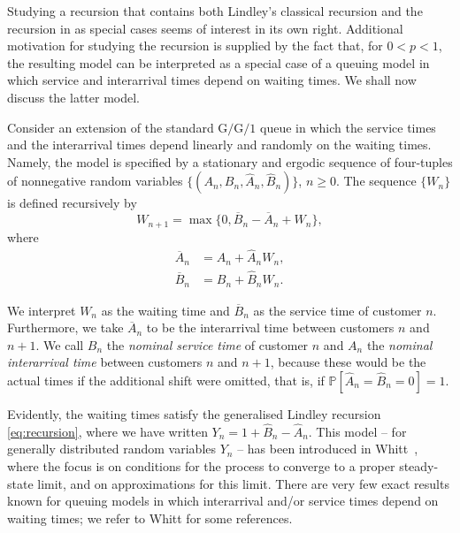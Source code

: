 \documentclass[reqno, 11pt, a4paper]{article}
\theoremstyle{plain}
\theoremstyle{remark}
\numberwithin{equation}{section}
\begin{document}
Studying a recursion that contains both Lindley's classical recursion and the recursion in \cite{park03, vlasiou05a, vlasiou05, vlasiou05b, vlasiou04} as special cases seems of interest in its own right. Additional motivation for studying the recursion is supplied by the fact that, for $0<p<1$, the resulting model can be interpreted as a special case of a queuing model in which service and interarrival times depend on waiting times. We shall now discuss the latter model.

Consider an extension of the standard $\mathrm{G/G/1}$ queue in which the service times and the interarrival times depend linearly and randomly on the waiting times. Namely, the model is specified by a stationary and ergodic sequence of four-tuples of nonnegative random variables $\{(A_n, B_n, \widehat{A}_n, \widehat{B}_n)\}$, $n\geqslant 0$. The sequence $\{W_n\}$ is defined recursively by
$$
 W_{n+1}=\max\{0, \overline{B}_n-\overline{A}_n+W_n\},
$$
where
\begin{align*}
  \overline{A}_n&=A_n+\widehat{A}_nW_n,\\
  \overline{B}_n&=B_n+\widehat{B}_nW_n.
\end{align*}

We interpret $W_n$ as the waiting time and $\overline{B}_n$ as the service time of customer $n$. Furthermore, we take $\overline{A}_n$ to be the interarrival time between customers $n$ and $n+1$. We call $B_n$ the \textit{nominal service time} of customer $n$ and $A_n$ the \textit{nominal interarrival time} between customers $n$ and $n+1$, because these would be the actual times if the additional shift were omitted, that is, if ${\mathbb{P}}[\widehat{A}_n=\widehat{B}_n=0]=1$.

Evidently, the waiting times satisfy the generalised Lindley recursion \eqref{eq:recursion}, where we have written $Y_n=1+\widehat{B}_n-\widehat{A}_n$. This model -- for generally distributed random variables $Y_n$ -- has been introduced in Whitt~\cite{whitt90}, where the focus is on conditions for the process to converge to a proper steady-state limit, and on approximations for this limit. There are very few exact results known for queuing models in which interarrival and/or service times depend on waiting times; we refer to Whitt \cite{whitt90} for some references.
\end{document}
